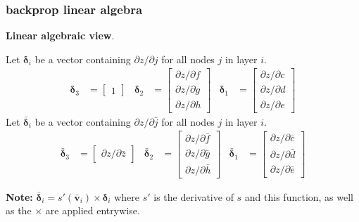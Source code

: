 \documentclass[handout,compress]{beamer}
\newcommand{\bs}[1]{\boldsymbol{#1}}
\begin{document}
	\begin{frame}
		\frametitle{backprop linear algebra}
		\small
		\textbf{Linear algebraic view}. 
		
		Let $\bs{\delta}_i$ be a vector containing $\partial z /\partial j$ for all nodes $j$ in layer $i$. 
		\begin{align*}
		\bs{\delta}_3 &= \begin{bmatrix}1\end{bmatrix} & \bs{\delta}_2 &= \begin{bmatrix}\partial z /\partial f\\\partial z /\partial g\\\partial z /\partial h\end{bmatrix} & \bs{\delta}_1 &= \begin{bmatrix}\partial z /\partial c\\\partial z /\partial d\\\partial z /\partial e\end{bmatrix} 
		\end{align*}
		Let $\bs{\bar{\delta}}_i$ be a vector containing $\partial z /\partial \bar{j}$ for all nodes $j$ in layer $i$. 
		\begin{align*}
		\bs{\bar{\delta}}_3 &= \begin{bmatrix}\partial z /\partial \bar{z}\end{bmatrix} & \bs{\bar{\delta}}_2 &= \begin{bmatrix}\partial z /\partial \bar{f}\\\partial z /\partial \bar{g}\\\partial z /\partial \bar{h}\end{bmatrix} & \bs{\bar{\delta}}_1 &= \begin{bmatrix}\partial z /\partial \bar{c}\\\partial z /\partial \bar{d}\\ \partial z /\partial \bar{e}\end{bmatrix} 
		\end{align*}
		
		\textbf{Note:} ${\bs{\bar{\delta}}}_i = s'(\bs{\bar{v}}_i) \times \bs{{\delta}}_i$ where $s'$ is the derivative of $s$ and this function, as well as the $\times$ are applied entrywise. 
	\end{frame}
	
\end{document}
